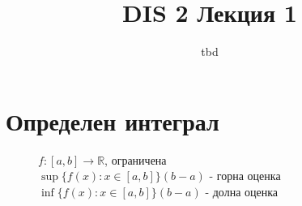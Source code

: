 \documentclass{article}
\author{tbd}
\title{DIS 2 Лекция 1}
\begin{document}
\maketitle

\section{Определен интеграл}
\begin{figure}[h!]
    
    

    \(f:[a,b] \to \mathbb{R} \), ограничена \\
    \(\sup\{ f(x) : x \in [a, b] \} (b-a)\) - горна оценка \\
    \(\inf\{ f(x) : x \in [a, b] \} (b-a)\) - долна оценка
    
\end{figure}
\end{document}
